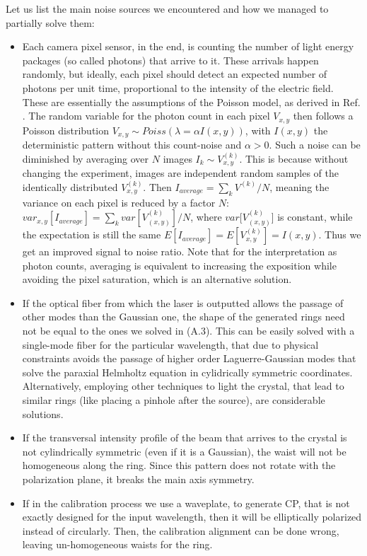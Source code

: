 \documentclass[11pt, a4paper, twoside]{article} %
\begin{document}
Let us list the main noise sources we encountered and how we managed to partially solve them:\vspace{-0.25cm}
\begin{itemize}
\item Each camera pixel sensor, in the end, is counting the number of light energy packages (so called photons) that arrive to it. These arrivals happen randomly, but ideally, each pixel should detect an expected number of photons per unit time, proportional to the intensity of the electric field. These are essentially the assumptions of the Poisson model, as derived in Ref. \cite{poisson}. The random variable for the photon count in each pixel $V_{x,y}$ then follows a Poisson distribution $V_{x,y}\sim Poiss(\lambda=\alpha I(x,y))$, with $I(x,y)$ the deterministic pattern without this count-noise and $\alpha>0$. Such a noise can be diminished by averaging over $N$ images $I_k\sim V^{(k)}_{x,y}$. This is because without changing the experiment, images are independent random samples of the identically distributed $V^{(k)}_{x,y}$. Then $I_{average}=\sum_{k}V^{(k)}/N$, meaning the variance on each pixel is reduced by a factor $N$: $var_{x,y}[I_{average}]=\sum_k var[V_{(x,y)}^{(k)}]/N$, where $var[V_{(x,y)}^{(k)}$] is constant, while the expectation is still the same $E[I_{average}]=E[V_{x,y}^{(k)}]=I(x,y)$. Thus we get an improved signal to noise ratio. Note that for the interpretation as photon counts, averaging is equivalent to increasing the exposition while avoiding the pixel saturation, which is an alternative solution.

\item If the optical fiber from which the laser is outputted allows the passage of other modes than the Gaussian one, the shape of the generated rings need not be equal to the ones we solved in (A.3). This can be easily solved with a single-mode fiber for the particular wavelength, that due to physical constraints avoids the passage of higher order Laguerre-Gaussian modes that solve the paraxial Helmholtz equation in cylidrically symmetric coordinates. Alternatively, employing other techniques to light the crystal, that lead to similar rings (like placing a pinhole after the source), are considerable solutions. \vspace{-0.1cm}

\item If the transversal intensity profile of the beam that arrives to the crystal is not cylindrically symmetric (even if it is a Gaussian), the waist will not be homogeneous along the ring. Since this pattern does not rotate with the polarization plane, it breaks the main axis symmetry.
\item If in the calibration process we use a waveplate, to generate CP, that is not exactly designed for the input wavelength, then it will be elliptically polarized instead of circularly. Then, the calibration alignment can be done wrong, leaving un-homogeneous waists for the ring.\vspace{-0.2cm}


\end{itemize}
\end{document}
